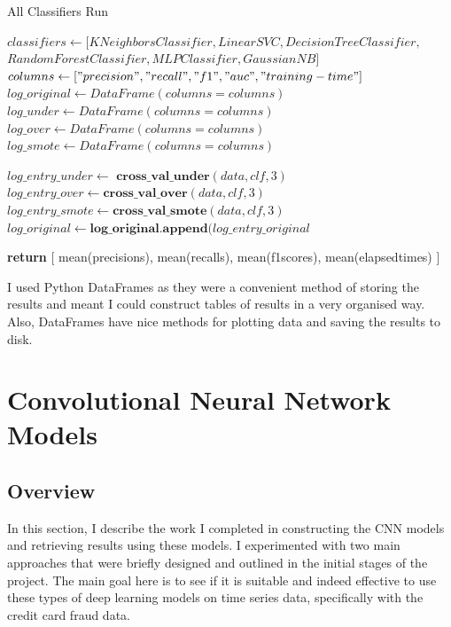 \documentclass[12pt,a4paper,twoside]{report}
\begin{document}
\begin{algorithm}[!hbtp]
\caption{All Classifiers Run }\label{alg:all-classifiers}
\begin{algorithmic}[1]
        \State
         \texttt{\State $classifiers \gets [KNeighborsClassifier, LinearSVC, DecisionTreeClassifier,$\\ $RandomForestClassifier, MLPClassifier, GaussianNB]$}
          \texttt{\State $columns \gets ["precision", "recall", "f1", "auc", "training-time"]$}
         \texttt{\State $log\_original \gets DataFrame(columns = columns)$}
         \texttt{\State $log\_under \gets DataFrame(columns = columns)$}
         \texttt{\State $log\_over \gets DataFrame(columns = columns)$}
         \texttt{\State $log\_smote \gets DataFrame(columns = columns)$}
         

            	\State $log\_entry\_under\gets  \textbf{ cross\_val\_under}(data, clf, 3) $
            	\State $log\_entry\_over \gets \textbf{cross\_val\_over}(data, clf, 3) $
            	\State $log\_entry\_smote \gets \textbf{cross\_val\_smote}(data, clf, 3) $
            	\State $log\_original \gets \textbf{log\_original.append}(log\_entry\_original $
   	\EndFor
   
   \State \textbf{return} [ mean(precisions), mean(recalls), mean(f1scores), mean(elapsedtimes) ]
   
\EndProcedure
\end{algorithmic}
\end{algorithm}

I used Python DataFrames as they were a convenient method of storing the results and meant I could construct tables of results in a very organised way. Also, DataFrames have nice methods for plotting data and saving the results to disk. 


\section{Convolutional Neural Network Models}

\subsection{Overview}
In this section, I describe the work I completed in constructing the CNN models and retrieving results using these models. I experimented with two main approaches that were briefly designed and outlined in the initial stages of the project. The main goal here is to see if it is suitable and indeed effective to use these types of deep learning models on time series data, specifically with the credit card fraud data.
\end{document}

